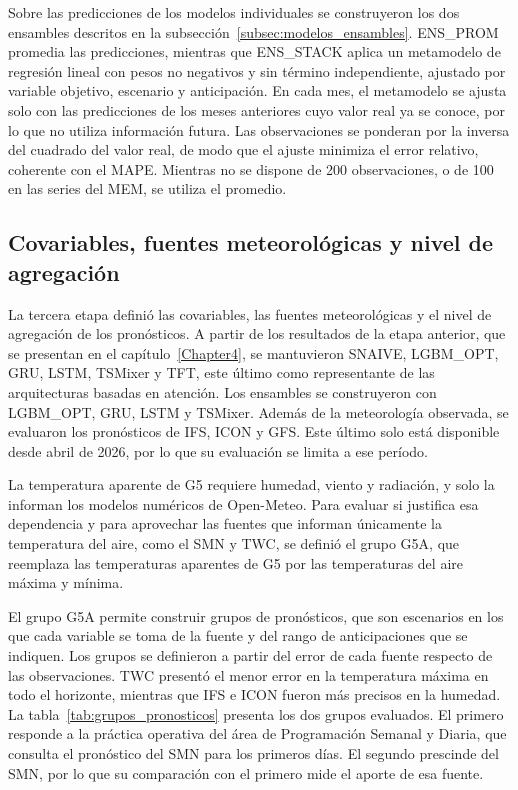 Sobre las predicciones de los modelos individuales se construyeron los dos ensambles descritos en la subsección~\ref{subsec:modelos_ensambles}. ENS\_PROM promedia las predicciones, mientras que ENS\_STACK aplica un metamodelo de regresión lineal con pesos no negativos y sin término independiente, ajustado por variable objetivo, escenario y anticipación. En cada mes, el metamodelo se ajusta solo con las predicciones de los meses anteriores cuyo valor real ya se conoce, por lo que no utiliza información futura. Las observaciones se ponderan por la inversa del cuadrado del valor real, de modo que el ajuste minimiza el error relativo, coherente con el MAPE. Mientras no se dispone de 200 observaciones, o de 100 en las series del MEM, se utiliza el promedio.

\subsection{Covariables, fuentes meteorológicas y nivel de agregación}
\label{subsec:covariables_agregacion}

La tercera etapa definió las covariables, las fuentes meteorológicas y el nivel de agregación de los pronósticos. A partir de los resultados de la etapa anterior, que se presentan en el capítulo~\ref{Chapter4}, se mantuvieron SNAIVE, LGBM\_OPT, GRU, LSTM, TSMixer y TFT, este último como representante de las arquitecturas basadas en atención. Los ensambles se construyeron con LGBM\_OPT, GRU, LSTM y TSMixer. Además de la meteorología observada, se evaluaron los pronósticos de IFS, ICON y GFS. Este último solo está disponible desde abril de 2026, por lo que su evaluación se limita a ese período.

La temperatura aparente de G5 requiere humedad, viento y radiación, y solo la informan los modelos numéricos de Open-Meteo. Para evaluar si justifica esa dependencia y para aprovechar las fuentes que informan únicamente la temperatura del aire, como el SMN y TWC, se definió el grupo G5A, que reemplaza las temperaturas aparentes de G5 por las temperaturas del aire máxima y mínima.

El grupo G5A permite construir grupos de pronósticos, que son escenarios en los que cada variable se toma de la fuente y del rango de anticipaciones que se indiquen. Los grupos se definieron a partir del error de cada fuente respecto de las observaciones. TWC presentó el menor error en la temperatura máxima en todo el horizonte, mientras que IFS e ICON fueron más precisos en la humedad. La tabla~\ref{tab:grupos_pronosticos} presenta los dos grupos evaluados. El primero responde a la práctica operativa del área de Programación Semanal y Diaria, que consulta el pronóstico del SMN para los primeros días. El segundo prescinde del SMN, por lo que su comparación con el primero mide el aporte de esa fuente.

